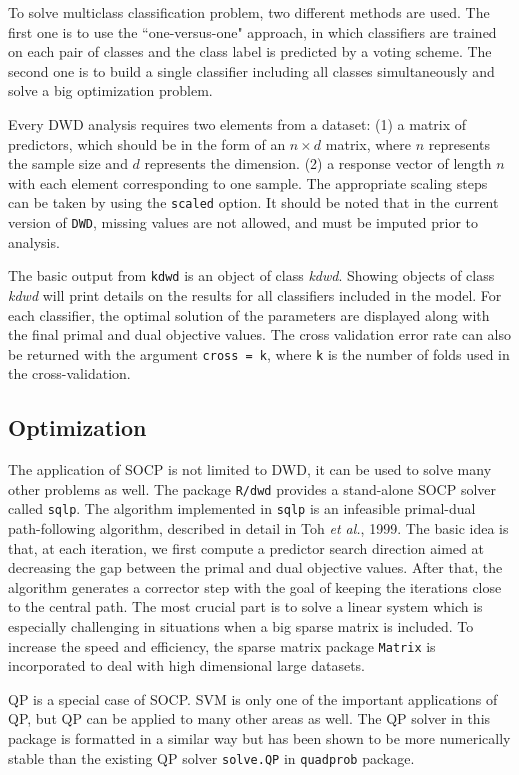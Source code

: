 \documentclass{bioinfo}
\begin{document}
To solve multiclass classification problem, two different methods are used. The
first one is to use the ``one-versus-one" approach, in which classifiers 
are trained on each pair of classes and the class label is predicted by a voting
scheme. The second one is to build a single classifier including all classes
simultaneously and solve a big optimization problem.

Every DWD analysis requires two elements from a dataset: (1) a matrix of 
predictors, which should be in the form of an $n \times d$ matrix, where $n$
represents the sample size and $d$ represents the dimension. (2) a response
vector of length $n$ with each element corresponding to one sample. The
appropriate scaling steps can be taken by using the \texttt{scaled} option. It
should be noted that in the current version of \texttt{DWD}, missing values are
not allowed, and must be imputed prior to analysis.

The basic output from \texttt{kdwd} is an object of class {\em kdwd}. Showing
objects of class {\em kdwd} will print details on the results for all
classifiers included in the model. For each classifier, the optimal solution of the
parameters are displayed along with the final primal and dual objective values.
The cross validation error rate can also be returned with the argument
\texttt{cross = k}, where \texttt{k} is the number of folds used in the
cross-validation.

\subsection{Optimization}
The application of SOCP is not limited to DWD, it can be used to solve many
other problems as well. The package \texttt{R/dwd} provides a stand-alone SOCP
solver called \texttt{sqlp}. The algorithm implemented in \texttt{sqlp} is an
infeasible primal-dual path-following algorithm, described in detail in Toh {\em
et al.}, 1999. The basic idea is that, at each iteration, we first compute a
predictor search direction aimed at decreasing the gap between the primal and dual
objective values. After that, the algorithm generates a corrector step with the
goal of keeping the iterations close to the central path. The most crucial
part is to solve a linear system which is especially challenging in situations
when a big sparse matrix is included. To increase the speed and efficiency, the
sparse matrix package \texttt{Matrix} is incorporated to deal with high
dimensional large datasets.

QP is a special case of SOCP. SVM is only one of the important applications
of QP, but QP can be applied to many other areas as well. The QP solver in this
package is formatted in a similar way but has been shown to be more numerically
stable than the existing QP solver \texttt{solve.QP} in \texttt{quadprob} package.
\end{document}
